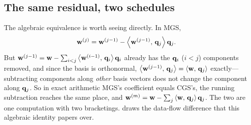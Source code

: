 \subsection{The same residual, two schedules}

The algebraic equivalence is worth seeing directly. In MGS,
\[
  \mathbf{w}^{(j)} = \mathbf{w}^{(j-1)} - \left\langle \mathbf{w}^{(j-1)},\, \mathbf{q}_j\right\rangle\mathbf{q}_j .
\]
But $\mathbf{w}^{(j-1)} = \mathbf{w} - \sum_{i<j}\left\langle \mathbf{w}^{(i-1)},\, \mathbf{q}_i\right\rangle\mathbf{q}_i$ already has the
$\mathbf{q}_i$ ($i<j$) components removed, and since the basis is orthonormal,
$\left\langle \mathbf{w}^{(j-1)},\, \mathbf{q}_j\right\rangle = \left\langle \mathbf{w},\, \mathbf{q}_j\right\rangle$ exactly---subtracting components
along \emph{other} basis vectors does not change the component along $\mathbf{q}_j$. So in
exact arithmetic MGS's coefficient equals CGS's, the running subtraction reaches the
same place, and $\mathbf{w}^{(m)} = \mathbf{w} - \sum_j \left\langle \mathbf{w},\, \mathbf{q}_j\right\rangle\mathbf{q}_j$. The two are one
computation with two bracketings.  draws the data-flow difference
that this algebraic identity papers over.

